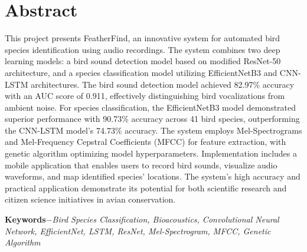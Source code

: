 \begin{flushright}
\vskip -20pt
\submittedBy
\end{flushright}

\chapter*{Abstract}
This project presents FeatherFind, an innovative system for automated bird species identification using audio recordings. The system combines two deep learning models: a bird sound detection model based on modified ResNet-50 architecture, and a species classification model utilizing EfficientNetB3 and CNN-LSTM architectures. The bird sound detection model achieved 82.97\% accuracy with an AUC score of 0.911, effectively distinguishing bird vocalizations from ambient noise. For species classification, the EfficientNetB3 model demonstrated superior performance with 90.73\% accuracy across 41 bird species, outperforming the CNN-LSTM model's 74.73\% accuracy. The system employs Mel-Spectrograms and Mel-Frequency Cepstral Coefficients (MFCC) for feature extraction, with genetic algorithm optimizing model hyperparameters. Implementation includes a mobile application that enables users to record bird sounds, visualize audio waveforms, and map identified species' locations. The system's high accuracy and practical application demonstrate its potential for both scientific research and citizen science initiatives in avian conservation.

{\textbf{Keywords}}{\textit{$-$Bird Species Classification, Bioacoustics, Convolutional Neural Network, EfficientNet, LSTM, ResNet, Mel-Spectrogram, MFCC, Genetic Algorithm}}



{
\KECadjusttocspacings %
\makeatletter
\def\@makeschapterhead#1{%
  {\newpage \parindent \z@ \raggedright
    \normalfont
    \interlinepenalty\@M
    \center \fontsize{16pt}{1} \bfseries \MakeUppercase{#1}\par\nobreak
    \vskip 18\p@ %
  }}
\makeatother 

\tableofcontents %
\listoffigures %
\listoftables %
}

